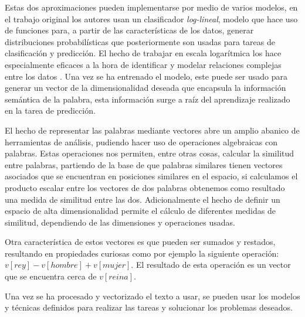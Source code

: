 Estas dos aproximaciones pueden implementarse por medio de varios modelos, en el
trabajo original los autores usan un clasificador \textit{log-lineal}, modelo
que hace uso de funciones para, a partir de las características de los datos,
generar distribuciones probabilísticas que posteriormente son usadas para
tareas de clasificación y predicción\cite{text2vec}. El hecho de trabajar en
escala logarítmica los hace especialmente eficaces a la hora de identificar y
modelar relaciones complejas entre los datos \cite{LogniearModels}. Una vez se
ha entrenado el modelo, este puede ser usado para generar un vector de la
dimensionalidad deseada que encapsula la información semántica de la palabra,
esta información surge a raíz del aprendizaje realizado en la tarea de
predicción.

El hecho de representar las palabras mediante vectores abre un amplio abanico de
herramientas de análisis, pudiendo hacer uso de operaciones algebraicas con
palabras. Estas operaciones nos permiten, entre otras cosas, calcular la
similitud entre palabras, partiendo de la base de que palabras similares tienen
vectores asociados que se encuentran en posiciones similares en el espacio, si
calculamos el producto escalar entre los vectores de dos palabras obtenemos como
resultado una medida de similitud entre las dos. Adicionalmente el hecho de
definir un espacio de alta dimensionalidad permite el cálculo de diferentes
medidas de similitud, dependiendo de las dimensiones y operaciones usadas.  

Otra característica de estos vectores es que pueden ser sumados y restados,
resultando en propiedades curiosas como por ejemplo la siguiente operación:
$v[rey] - v[hombre] + v[mujer]$. El resultado de esta operación es un vector
que se encuentra cerca de $v[reina]$. 

Una vez se ha procesado y vectorizado el texto a usar, se pueden usar los
modelos y técnicas definidos para realizar las tareas y solucionar los problemas
deseados.



